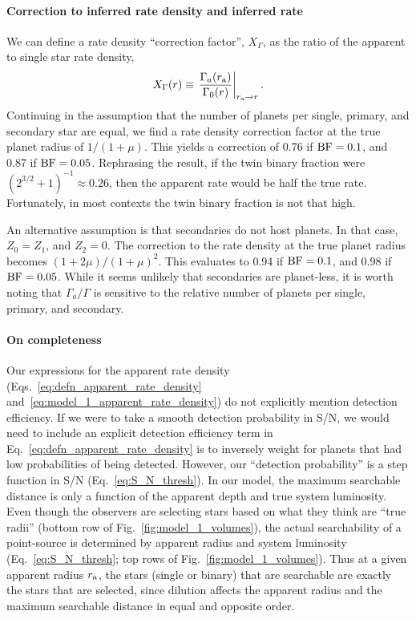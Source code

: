 \documentclass[12pt,modern]{aastex61}
\renewcommand{\a}{_{\rm a}}
\begin{document}
\paragraph{Correction to inferred rate density and inferred rate}
We can define a rate density ``correction factor'', $X_\Gamma$, as the ratio 
of the apparent to single star rate density,
\begin{equation}
X_\Gamma(r) \equiv \left. \frac{\Gamma_a(r\a)}{\Gamma_0(r)} \right|_{r\a 
\rightarrow r}.
\end{equation}
Continuing in the assumption that the number of planets per single, primary, 
and secondary star are equal, we find a rate density 
correction factor at the true planet radius of $1/(1+\mu)$.
This yields a correction of 0.76 if ${\rm BF}=0.1$, and 0.87 if ${\rm 
BF}=0.05$. Rephrasing the result, if the twin binary fraction were 
$(2^{3/2}+1)^{-1}\approx 0.26$, then the apparent rate would be half the true 
rate. Fortunately, in most contexts the twin binary fraction is not that high.

An alternative assumption is that secondaries do not host planets. In that 
case, $Z_0=Z_1$, and $Z_2=0$. The correction to the rate density at the true 
planet radius becomes $(1+2\mu)/(1+\mu)^2$.
This evaluates to 0.94 if ${\rm BF}=0.1$, and 0.98 if ${\rm BF}=0.05$.
While it seems unlikely that secondaries are planet-less, 
it is worth noting that $\Gamma_a/\Gamma$ is sensitive to the relative number 
of planets per single, primary, and secondary.

\paragraph{On completeness}
Our expressions for the apparent rate density 
(Eqs.~\ref{eq:defn_apparent_rate_density} 
and~\ref{eq:model_1_apparent_rate_density}) do not explicitly mention 
detection efficiency.
If we were to take a smooth detection probability in S/N, we would need to 
include an explicit detection efficiency term in 
Eq.~\ref{eq:defn_apparent_rate_density} is to inversely weight for planets 
that had low probabilities of being detected.
However, our ``detection probability'' is a step function in S/N 
(Eq.~\ref{eq:S_N_thresh}).
In our model, the maximum searchable distance is only a function of the 
apparent depth and true system luminosity.
Even though the observers are selecting stars based on what they think are 
``true radii'' (bottom row of Fig.~\ref{fig:model_1_volumes}), the 
actual searchability of a point-source is determined by apparent radius and 
system luminosity (Eq.~\ref{eq:S_N_thresh}; top rows of 
Fig.~\ref{fig:model_1_volumes}).
Thus at a given apparent radius $r\a$, the stars (single or binary) that are 
searchable are exactly the stars that are selected, since dilution affects the 
apparent radius and the maximum searchable distance in equal and opposite 
order.
\end{document}
